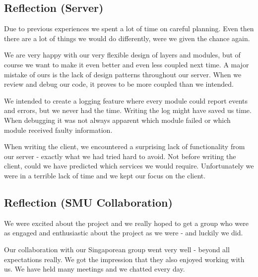 \subsection{Reflection (Server)}
Due to previous experiences we spent a lot of time on careful planning. Even then there are a lot of things we would do differently, were we given the chance again.

We are very happy with our very flexible design of layers and modules, but of course we want to make it even better and even less coupled next time. A major mistake of ours is the lack of design patterns throughout our server. When we review and debug our code, it proves to be more coupled than we intended. 

We intended to create a logging feature where every module could report events and errors, but we never had the time. Writing the log might have saved us time. When debugging it was not always apparent which module failed or which module received faulty information. 

When writing the client, we encountered a surprising lack of functionality from our server - exactly what we had tried hard to avoid. Not before writing the client, could we have predicted which services we would require. Unfortunately we were in a terrible lack of time and we kept our focus on the client.

\subsection{Reflection (SMU Collaboration)}
We were excited about the project and we really hoped to get a group who were as engaged and enthusiastic about the project as we were - and luckily we did.

Our collaboration with our Singaporean group went very well - beyond all expectations really. We got the impression that they also enjoyed working with us. We have held many meetings and we chatted every day.
\newpage